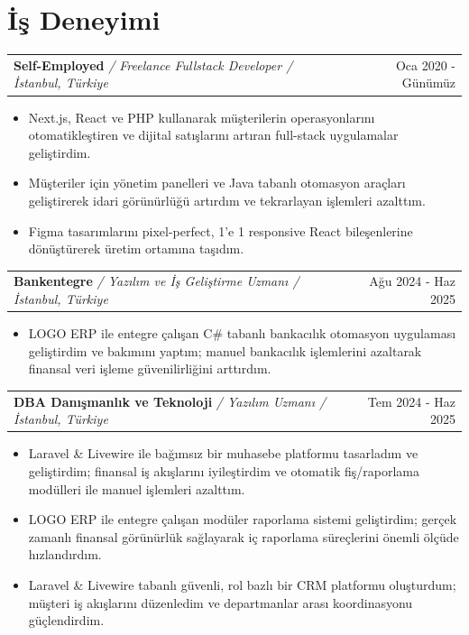 \documentclass[a4paper,12pt]{article}
\makeatletter
\newenvironment{joblong}[4]
    {
    \begin{tabularx}{\linewidth}{@{}l X r@{}}
    \textbf{#1} {\small\textit{/ #2 / #4} } & \hfill & #3 \\[3.5pt]
    \end{tabularx}
    \vspace{3.5pt}
    \begin{minipage}[t]{\linewidth}
    \begin{itemize}[nosep,after=\strut, leftmargin=1.5em, itemsep=4pt,label=--]
    }
    {
    \end{itemize}
    \end{minipage}
    \vspace{-6pt}
    }
\makeatother
\begin{document}
\section{İş Deneyimi}

\begin{joblong}{Self-Employed}{Freelance Fullstack Developer}{Oca 2020 - Günümüz}{İstanbul, Türkiye}
\item Next.js, React ve PHP kullanarak müşterilerin operasyonlarını otomatikleştiren ve dijital satışlarını artıran full-stack uygulamalar geliştirdim.
\item Müşteriler için yönetim panelleri ve Java tabanlı otomasyon araçları geliştirerek idari görünürlüğü artırdım ve tekrarlayan işlemleri azalttım.
\item Figma tasarımlarını pixel-perfect, 1’e 1 responsive React bileşenlerine dönüştürerek üretim ortamına taşıdım.
\end{joblong}

\begin{joblong}{Bankentegre}{Yazılım ve İş Geliştirme Uzmanı}{Ağu 2024 - Haz 2025}{İstanbul, Türkiye}
\item LOGO ERP ile entegre çalışan C\# tabanlı bankacılık otomasyon uygulaması geliştirdim ve bakımını yaptım; manuel bankacılık işlemlerini azaltarak finansal veri işleme güvenilirliğini arttırdım.
\vspace{-2pt}
\end{joblong}

\begin{joblong}{DBA Danışmanlık ve Teknoloji}{Yazılım Uzmanı}{Tem 2024 - Haz 2025}{İstanbul, Türkiye}
\item Laravel \& Livewire ile bağımsız bir muhasebe platformu tasarladım ve geliştirdim; finansal iş akışlarını iyileştirdim ve otomatik fiş/raporlama modülleri ile manuel işlemleri azalttım.
\item LOGO ERP ile entegre çalışan modüler raporlama sistemi geliştirdim; gerçek zamanlı finansal görünürlük sağlayarak iç raporlama süreçlerini önemli ölçüde hızlandırdım.
\item Laravel \& Livewire tabanlı güvenli, rol bazlı bir CRM platformu oluşturdum; müşteri iş akışlarını düzenledim ve departmanlar arası koordinasyonu güçlendirdim.
\end{joblong}
\vspace{-8pt}
\end{document}
